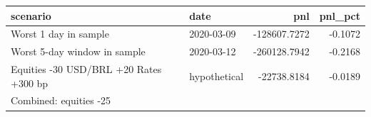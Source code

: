 \begin{tabular}{llrr}
\toprule
scenario & date & pnl & pnl_pct \\
\midrule
Worst 1 day in sample & 2020-03-09 & -128607.7272 & -0.1072 \\
Worst 5-day window in sample & 2020-03-12 & -260128.7942 & -0.2168 \\
Equities -30%
USD/BRL +20%
Rates +300 bp & hypothetical & -22738.8184 & -0.0189 \\
Combined: equities -25%
\bottomrule
\end{tabular}
